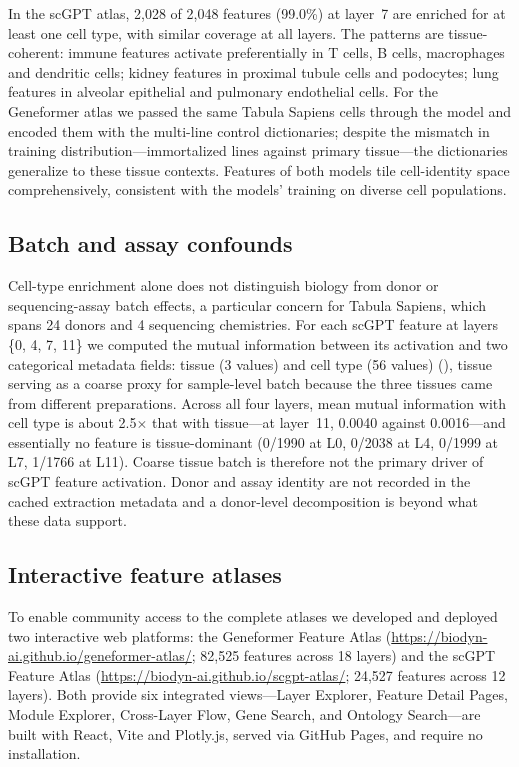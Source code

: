\documentclass[onecolumn,11pt]{article}
\begin{document}
In the scGPT atlas, 2,028 of 2,048 features (99.0\%) at layer~7 are enriched for at least one cell
type, with similar coverage at all layers. The patterns are tissue-coherent: immune features
activate preferentially in T cells, B cells, macrophages and dendritic cells; kidney features in
proximal tubule cells and podocytes; lung features in alveolar epithelial and pulmonary endothelial
cells. For the Geneformer atlas we passed the same Tabula Sapiens cells through the model and
encoded them with the multi-line control dictionaries; despite the mismatch in training
distribution---immortalized lines against primary tissue---the dictionaries generalize to these
tissue contexts. Features of both models tile cell-identity space
comprehensively, consistent with the models' training on diverse cell populations.

\subsection*{Batch and assay confounds}
\label{sec:batch}

Cell-type enrichment alone does not distinguish biology from donor or sequencing-assay batch
effects, a particular concern for Tabula Sapiens, which spans 24 donors and 4 sequencing
chemistries. For each scGPT feature at layers \{0, 4, 7, 11\} we computed the mutual information
between its activation and two categorical metadata fields: tissue (3 values) and cell type (56 values)
(), tissue serving as a coarse proxy for sample-level batch because the three tissues came
from different preparations. Across all four layers, mean mutual information with cell type is
about 2.5$\times$ that with tissue---at layer~11, 0.0040 against 0.0016---and essentially no
feature is tissue-dominant (0/1990 at L0, 0/2038 at L4, 0/1999 at L7, 1/1766 at L11). Coarse tissue
batch is therefore not the primary driver of scGPT feature activation. Donor and assay identity are
not recorded in the cached extraction metadata and a donor-level decomposition is beyond what these
data support.

\subsection*{Interactive feature atlases}
\label{sec:atlases}

To enable community access to the complete atlases we developed and deployed two interactive web
platforms: the Geneformer Feature Atlas
(\url{https://biodyn-ai.github.io/geneformer-atlas/}; 82,525 features across 18 layers) and the
scGPT Feature Atlas (\url{https://biodyn-ai.github.io/scgpt-atlas/}; 24,527 features across 12
layers). Both provide six integrated views---Layer Explorer, Feature Detail Pages, Module Explorer,
Cross-Layer Flow, Gene Search, and Ontology Search---are built with React, Vite and Plotly.js,
served via GitHub Pages, and require no installation.
\end{document}
